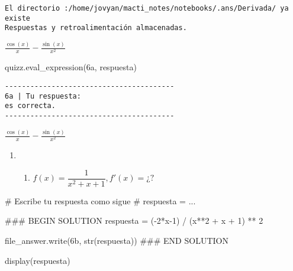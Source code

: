 \documentclass[
  letterpaper,
  DIV=11,
  numbers=noendperiod]{scrreprt}
\newenvironment{Shaded}{\begin{snugshade}}{\end{snugshade}}
\newcommand{\BuiltInTok}[1]{\textcolor[rgb]{0.00,0.23,0.31}{#1}}
\newcommand{\CommentTok}[1]{\textcolor[rgb]{0.37,0.37,0.37}{#1}}
\newcommand{\DecValTok}[1]{\textcolor[rgb]{0.68,0.00,0.00}{#1}}
\newcommand{\NormalTok}[1]{\textcolor[rgb]{0.00,0.23,0.31}{#1}}
\newcommand{\OperatorTok}[1]{\textcolor[rgb]{0.37,0.37,0.37}{#1}}
\newcommand{\RegionMarkerTok}[1]{\textcolor[rgb]{0.00,0.23,0.31}{#1}}
\newcommand{\StringTok}[1]{\textcolor[rgb]{0.13,0.47,0.30}{#1}}
\providecommand{\tightlist}{%
  \setlength{\itemsep}{0pt}\setlength{\parskip}{0pt}}\usepackage{longtable,booktabs,array}
\begin{document}
\begin{verbatim}
El directorio :/home/jovyan/macti_notes/notebooks/.ans/Derivada/ ya existe
Respuestas y retroalimentación almacenadas.
\end{verbatim}

$\displaystyle \frac{\cos{\left(x \right)}}{x} - \frac{\sin{\left(x \right)}}{x^{2}}$

\begin{Shaded}
\begin{Highlighting}[]
\NormalTok{quizz.eval\_expression(}\StringTok{\textquotesingle{}6a\textquotesingle{}}\NormalTok{, respuesta)}
\end{Highlighting}
\end{Shaded}

\begin{verbatim}
----------------------------------------
6a | Tu respuesta:
es correcta.
----------------------------------------
\end{verbatim}

$\displaystyle \frac{\cos{\left(x \right)}}{x} - \frac{\sin{\left(x \right)}}{x^{2}}$

\begin{enumerate}
\def\labelenumi{\arabic{enumi}.}
\setcounter{enumi}{5}
\tightlist
\item
  \begin{enumerate}
  \def\labelenumii{\alph{enumii}.}
  \setcounter{enumii}{1}
  \tightlist
  \item
    \(f(x) = \dfrac{1}{x^2+x+1}, f'(x) = ¿?\)
  \end{enumerate}
\end{enumerate}

\begin{Shaded}
\begin{Highlighting}[]
\CommentTok{\# Escribe tu respuesta como sigue }
\CommentTok{\# respuesta = ...}

\CommentTok{\#\#\# }\RegionMarkerTok{BEGIN}\CommentTok{ SOLUTION}
\NormalTok{respuesta }\OperatorTok{=}\NormalTok{ (}\OperatorTok{{-}}\DecValTok{2}\OperatorTok{*}\NormalTok{x}\OperatorTok{{-}}\DecValTok{1}\NormalTok{) }\OperatorTok{/}\NormalTok{ (x}\OperatorTok{**}\DecValTok{2} \OperatorTok{+}\NormalTok{ x }\OperatorTok{+} \DecValTok{1}\NormalTok{) }\OperatorTok{**} \DecValTok{2}

\NormalTok{file\_answer.write(}\StringTok{\textquotesingle{}6b\textquotesingle{}}\NormalTok{, }\BuiltInTok{str}\NormalTok{(respuesta))}
\CommentTok{\#\#\# }\RegionMarkerTok{END}\CommentTok{ SOLUTION}

\NormalTok{display(respuesta)}
\end{Highlighting}
\end{Shaded}
\end{document}
